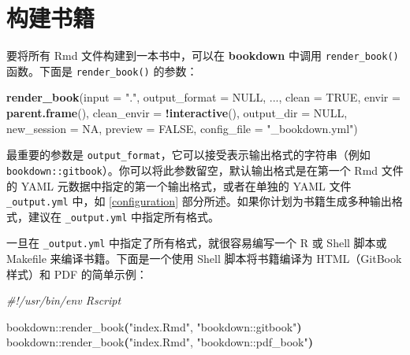 \documentclass[
  12pt,
]{krantz}
\newenvironment{Shaded}{\begin{snugshade}}{\end{snugshade}}
\newcommand{\AttributeTok}[1]{\textcolor[rgb]{0.13,0.29,0.53}{#1}}
\newcommand{\CommentTok}[1]{\textcolor[rgb]{0.56,0.35,0.01}{\textit{#1}}}
\newcommand{\ConstantTok}[1]{\textcolor[rgb]{0.56,0.35,0.01}{#1}}
\newcommand{\ErrorTok}[1]{\textcolor[rgb]{0.64,0.00,0.00}{\textbf{#1}}}
\newcommand{\ExtensionTok}[1]{#1}
\newcommand{\FunctionTok}[1]{\textcolor[rgb]{0.13,0.29,0.53}{\textbf{#1}}}
\newcommand{\KeywordTok}[1]{\textcolor[rgb]{0.13,0.29,0.53}{\textbf{#1}}}
\newcommand{\NormalTok}[1]{#1}
\newcommand{\SpecialCharTok}[1]{\textcolor[rgb]{0.81,0.36,0.00}{\textbf{#1}}}
\newcommand{\StringTok}[1]{\textcolor[rgb]{0.31,0.60,0.02}{#1}}
\theoremstyle{definition}
\theoremstyle{definition}
\theoremstyle{definition}
\theoremstyle{definition}
\theoremstyle{remark}
\begin{document}
\section{构建书籍}\label{build-the-book}

要将所有 Rmd 文件构建到一本书中，可以在 \textbf{bookdown} 中调用 \texttt{render\_book()}函数。下面是 \texttt{render\_book()} 的参数：

\begin{Shaded}
\begin{Highlighting}[]
\FunctionTok{render\_book}\NormalTok{(}\AttributeTok{input =} \StringTok{"."}\NormalTok{, }\AttributeTok{output\_format =} \ConstantTok{NULL}\NormalTok{, ...,}
  \AttributeTok{clean =} \ConstantTok{TRUE}\NormalTok{, }\AttributeTok{envir =} \FunctionTok{parent.frame}\NormalTok{(),}
  \AttributeTok{clean\_envir =} \SpecialCharTok{!}\FunctionTok{interactive}\NormalTok{(), }\AttributeTok{output\_dir =} \ConstantTok{NULL}\NormalTok{,}
  \AttributeTok{new\_session =} \ConstantTok{NA}\NormalTok{, }\AttributeTok{preview =} \ConstantTok{FALSE}\NormalTok{,}
  \AttributeTok{config\_file =} \StringTok{"\_bookdown.yml"}\NormalTok{)}
\end{Highlighting}
\end{Shaded}

最重要的参数是 \texttt{output\_format}，它可以接受表示输出格式的字符串（例如 \texttt{\textquotesingle{}bookdown::gitbook\textquotesingle{}}）。你可以将此参数留空，默认输出格式是在第一个 Rmd 文件的 YAML 元数据中指定的第一个输出格式，或者在单独的 YAML 文件 \texttt{\_output.yml} 中，如 \ref{configuration} 部分所述。如果你计划为书籍生成多种输出格式，建议在 \texttt{\_output.yml} 中指定所有格式。

一旦在 \texttt{\_output.yml} 中指定了所有格式，就很容易编写一个 R 或 Shell 脚本或 Makefile 来编译书籍。下面是一个使用 Shell 脚本将书籍编译为 HTML（GitBook 样式）和 PDF 的简单示例：

\begin{Shaded}
\begin{Highlighting}[]
\CommentTok{\#!/usr/bin/env Rscript}

\ExtensionTok{bookdown::render\_book}\ErrorTok{(}\StringTok{"index.Rmd"}\ExtensionTok{,} \StringTok{"bookdown::gitbook"}\KeywordTok{)}
\ExtensionTok{bookdown::render\_book}\ErrorTok{(}\StringTok{"index.Rmd"}\ExtensionTok{,} \StringTok{"bookdown::pdf\_book"}\KeywordTok{)}
\end{Highlighting}
\end{Shaded}
\end{document}
